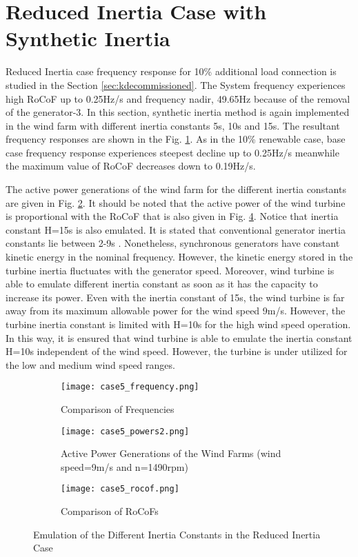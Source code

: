 \section{Reduced Inertia Case with Synthetic Inertia}
Reduced Inertia case frequency response for 10\% additional load connection is studied in the Section \ref{sec:kdecommissioned}. The System frequency experiences high RoCoF up to 0.25Hz/s and frequency nadir, 49.65Hz because of the removal of the generator-3. In this section, synthetic inertia method is again implemented in the wind farm with different inertia constants 5s, 10s and 15s. The resultant frequency responses are shown in the Fig. \ref{Case5_freq}. As in the 10\% renewable case, base case frequency response experiences steepest decline up to 0.25Hz/s meanwhile the maximum value of RoCoF decreases down to 0.19Hz/s. \par
The active power generations of the wind farm for the different inertia constants are given in Fig. \ref{Case5_power}. It should be noted that the active power of the wind turbine is proportional with the RoCoF that is also given in Fig. \ref{Case5_rocof}. Notice that inertia constant H=15s is also emulated. It is stated that conventional generator inertia constants lie between 2-9s \cite{Kundur}. Nonetheless, synchronous generators have constant kinetic energy in the nominal frequency. However, the kinetic energy stored in the turbine inertia fluctuates with the generator speed. Moreover, wind turbine is able to emulate different inertia constant as soon as it has the capacity to increase its power. Even with the inertia constant of 15s, the wind turbine is far away from its maximum allowable power for the wind speed 9m/s. However, the turbine inertia constant is limited with H=10s for the high wind speed operation. In this way, it is ensured that wind turbine is able to emulate the inertia constant H=10s independent of the wind speed. However, the turbine is under utilized for the low and medium wind speed ranges.
\begin{figure}[h!]
	\centering
	\begin{subfigure}{0.9\textwidth} %
		\centering	\texttt{[image: case5\_frequency.png]}
		\caption{Comparison of Frequencies}		
		\label{Case5_freq}
	\end{subfigure}
	\vspace{0.1em} %
	\begin{subfigure}{0.9\textwidth}
		\centering	\texttt{[image: case5\_powers2.png]}
		\caption{Active Power Generations of the Wind Farms (wind speed=9m/s and n=1490rpm)}
		\label{Case5_power}	
	\end{subfigure}
	\vspace{0.1em} %
	\begin{subfigure}{0.9\textwidth}
		\centering	
		\texttt{[image: case5\_rocof.png]}
		\caption{Comparison of RoCoFs}
		\label{Case5_rocof}	
	\end{subfigure}
	\caption{Emulation of the Different Inertia Constants in the Reduced Inertia Case}
\end{figure}
